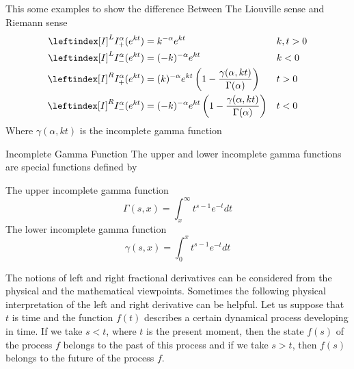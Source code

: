 This some examples to show the difference Between The Liouville sense and Riemann sense
\begin{align*}
    \leftindex[I]^L {I_{+}^{\alpha}} (e^{kt}) &= k^{-\alpha}e^{kt} && k,t>0
    \\
    \leftindex[I]^L {I_{-}^{\alpha}} (e^{kt}) &= (-k)^{-\alpha}e^{kt} && k<0
    \\
    \leftindex[I]^R {I_{+}^{\alpha}} (e^{kt}) &= (k)^{-\alpha}e^{kt} \left( 1- \frac{\gamma(\alpha,kt)}{\Gamma(\alpha)} \right) && t>0
    \\
    \leftindex[I]^R {I_{-}^{\alpha}} (e^{kt}) &= (-k)^{-\alpha}e^{kt} \left( 1- \frac{\gamma(\alpha,kt)}{\Gamma(\alpha)} \right) && t<0
\end{align*}
Where $\gamma(\alpha,kt)$ is the incomplete gamma function
\begin{enrichment*}{Incomplete Gamma Function}
    The upper and lower incomplete gamma functions are special functions defined by
    
    The upper incomplete gamma function
    \[
    \Gamma(s,x) = \int_{x}^{\infty} t^{s-1} e^{-t} dt
    \]
    The lower incomplete gamma function
    \[
    \gamma(s,x) = \int_{0}^{x} t^{s-1} e^{-t} dt
    \]
\end{enrichment*}
The notions of left and right fractional derivatives can be considered
from the physical and the mathematical viewpoints.
Sometimes the following physical interpretation of the left and right
derivative can be helpful.
Let us suppose that $t$ is time and the function $f(t)$ describes a certain
dynamical process developing in time. If we take $s < t$, where $t$ is the 
present moment, then the state $f(s)$ of the process $f$ belongs to the past
of this process and if we take $s > t$, then $f(s)$ belongs to the future of the process $f$.


